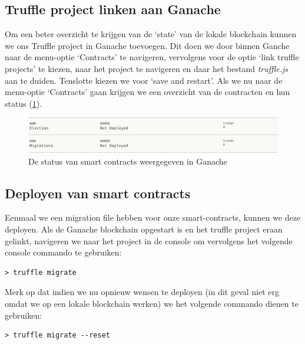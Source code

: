 	\subsection{Truffle project linken aan Ganache}
	
	Om een beter overzicht te krijgen van de `state' van de lokale blockchain kunnen we ons Truffle project in Ganache toevoegen. Dit doen we door binnen Ganche naar de menu-optie `Contracts' te navigeren, vervolgens voor de optie `link truffle  projects'  te kiezen, naar het project te navigeren en daar het bestand \textit{truffle.js} aan te duiden. Tenslotte  kiezen we voor `save and restart'. Als we nu naar de menu-optie `Contracts' gaan krijgen we een overzicht van de contracten en hun status (\ref{fig:contracts-ganache1}).
	
	\begin{figure}
		\includegraphics[width=\linewidth]{img/contracts-ganache1.png}
		\caption{De status van smart contracts weergegeven in Ganache}
		\label{fig:contracts-ganache1}
	\end{figure}
	
	
	\subsection{Deployen van smart contracts}
	
	Eenmaal we een migration file hebben voor onze smart-contracts, kunnen we deze deployen. Als de Ganache blockchain opgestart is en het truffle project eraan gelinkt, navigeren we naar het project in de console om vervolgens het volgende console commando te gebruiken:
	
	\begin{lstlisting}[numbers=none]
	> truffle migrate
	\end{lstlisting}
	
	Merk op dat indien we nu opnieuw wensen te deployen (in dit geval niet erg omdat we op een lokale blockchain werken) we het volgende commando dienen te gebruiken:
	
	\begin{lstlisting}[numbers=none]
	> truffle migrate --reset
	\end{lstlisting}
	

